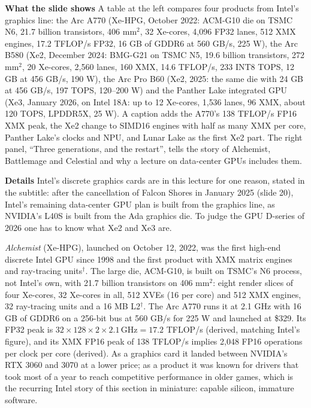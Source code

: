 \documentclass[11pt,letterpaper]{article}
\newcommand{\para}[1]{\medskip\noindent\textbf{#1}\quad}
\begin{document}
\para{What the slide shows} A table at the left compares four products from Intel's graphics line: the Arc A770 (Xe-HPG, October 2022: ACM-G10 die on TSMC N6, 21.7 billion transistors, 406 mm$^2$, 32 Xe-cores, 4{,}096 FP32 lanes, 512 XMX engines, 17.2 TFLOP/s FP32, 16 GB of GDDR6 at 560 GB/s, 225 W), the Arc B580 (Xe2, December 2024: BMG-G21 on TSMC N5, 19.6 billion transistors, 272 mm$^2$, 20 Xe-cores, 2{,}560 lanes, 160 XMX, 14.6 TFLOP/s, 233 INT8 TOPS, 12 GB at 456 GB/s, 190 W), the Arc Pro B60 (Xe2, 2025: the same die with 24 GB at 456 GB/s, 197 TOPS, 120--200 W) and the Panther Lake integrated GPU (Xe3, January 2026, on Intel 18A: up to 12 Xe-cores, 1{,}536 lanes, 96 XMX, about 120 TOPS, LPDDR5X, 25 W). A caption adds the A770's 138 TFLOP/s FP16 XMX peak, the Xe2 change to SIMD16 engines with half as many XMX per core, Panther Lake's clocks and NPU, and Lunar Lake as the first Xe2 part. The right panel, ``Three generations, and the restart'', tells the story of Alchemist, Battlemage and Celestial and why a lecture on data-center GPUs includes them.

\para{Details} Intel's discrete graphics cards are in this lecture for one reason, stated in the subtitle: after the cancellation of Falcon Shores in January 2025 (slide 20), Intel's remaining data-center GPU plan is built from the graphics line, as NVIDIA's L40S is built from the Ada graphics die. To judge the GPU D-series of 2026 one has to know what Xe2 and Xe3 are.

\emph{Alchemist} (Xe-HPG), launched on October 12, 2022, was the first high-end discrete Intel GPU since 1998 and the first product with XMX matrix engines and ray-tracing units$^\dagger$. The large die, ACM-G10, is built on TSMC's N6 process, not Intel's own, with 21.7 billion transistors on 406 mm$^2$: eight render slices of four Xe-cores, 32 Xe-cores in all, 512 XVEs (16 per core) and 512 XMX engines, 32 ray-tracing units and a 16 MB L2$^\dagger$. The Arc A770 runs it at 2.1 GHz with 16 GB of GDDR6 on a 256-bit bus at 560 GB/s for 225 W and launched at \$329. Its FP32 peak is $32 \times 128 \times 2 \times 2.1\,\text{GHz} = 17.2$ TFLOP/s (derived, matching Intel's figure), and its XMX FP16 peak of 138 TFLOP/s implies 2{,}048 FP16 operations per clock per core (derived). As a graphics card it landed between NVIDIA's RTX 3060 and 3070 at a lower price; as a product it was known for drivers that took most of a year to reach competitive performance in older games, which is the recurring Intel story of this section in miniature: capable silicon, immature software.
\end{document}
